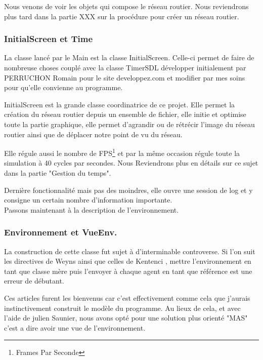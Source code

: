\documentclass[a4paper,11pt]{article}
\begin{document}
\vspace{0.35cm} 
 
Nous venons de voir les objets qui compose le réseau routier. Nous reviendrons plus tard dans la partie XXX sur la procédure pour créer un réseau routier.

\subsubsection{InitialScreen et Time}

La classe lancé par le Main est la classe InitialScreen. Celle-ci permet de faire de nombreuse choses couplé avec la classe TimerSDL développer initialement par PERRUCHON Romain pour le site developpez.com et modifier par mes soins pour qu'elle convienne au programme. 

InitialScreen est la grande classe coordinatrice de ce projet. Elle permet la création du réseau routier depuis un ensemble de fichier, elle initie et optimise toute la partie graphique, elle permet d'agrandir ou de rétrécir l'image du réseau routier ainsi que de déplacer notre point de vu du réseau.

Elle régule aussi le nombre de FPS\footnote{Frames Par Seconde} et par la même occasion régule toute la simulation à 40 cycles par secondes. Nous Reviendrons plus en détails sur ce sujet dans la partie "Gestion du temps".

Dernière fonctionnalité mais pas des moindres, elle ouvre une session de log et y consigne un certain nombre d'information importante.\\

Passons maintenant à la description de l'environnement.

\subsubsection{Environnement et VueEnv.}

La construction de cette classe fut sujet à d'interminable controverse. Si l'on suit les directives de Weyns \cite{Weyns05environmentfor} ainsi que celles de Kentenci \cite{EUMAS10_Ketenci}, mettre l'environnement en tant que classe mère puis l'envoyer à chaque agent en tant que référence est une erreur de débutant. 

Ces articles furent les bienvenus car c'est effectivement comme cela que j'aurais instinctivement construit le modèle du programme. Au lieux de cela, et avec l'aide de julien Saunier, nous avons opté pour une solution plus orienté "MAS" c'est a dire avoir une vue de l'environnement. 
\end{document}
